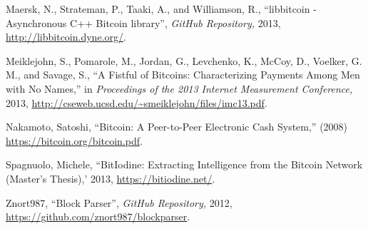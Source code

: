 \small{
\begin{thebibliography}{99}

 Maersk, N., Strateman, P., Taaki, A., and Williamson, R., ``libbitcoin - Asynchronous C++ Bitcoin library'', \emph{GitHub Repository,} 2013,
\url{http://libbitcoin.dyne.org/}.

 Meiklejohn, S., Pomarole, M., Jordan, G., Levchenko, K., McCoy,
D., Voelker, G. M., and Savage, S., ``A Fistful of Bitcoins: Characterizing Payments Among
Men with No Names,'' in \emph{Proceedings of the 2013 Internet Measurement Conference,} 2013, \url{http://cseweb.ucsd.edu/~smeiklejohn/files/imc13.pdf}.

 Nakamoto, Satoshi, ``Bitcoin: A Peer-to-Peer Electronic Cash System,'' (2008) \url{https://bitcoin.org/bitcoin.pdf}.

 Spagnuolo, Michele, ``BitIodine: Extracting Intelligence from the Bitcoin Network (Master's Thesis),' 2013, \url{https://bitiodine.net/}. 

 Znort987, ``Block Parser'', \emph{GitHub Repository,} 2012,
\url{https://github.com/znort987/blockparser}.




\end{thebibliography}
}